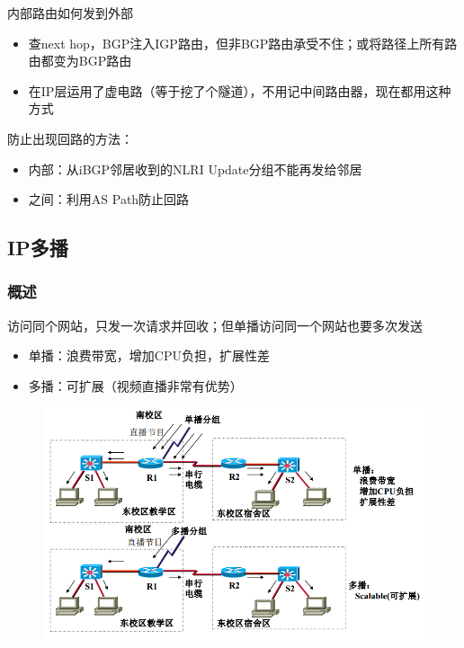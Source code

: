 内部路由如何发到外部
\begin{itemize}
\item 查next hop，BGP注入IGP路由，但非BGP路由承受不住；或将路径上所有路由都变为BGP路由
\item 在IP层运用了虚电路（等于挖了个隧道），不用记中间路由器，现在都用这种方式
\end{itemize}

\myhline
防止出现回路的方法：
\begin{itemize}
\item 内部：从iBGP邻居收到的NLRI Update分组不能再发给邻居
\item 之间：利用AS Path防止回路
\end{itemize}

\subsection{IP多播}
\subsubsection{概述}
访问同个网站，只发一次请求并回收；但单播访问同一个网站也要多次发送
\begin{itemize}
\item 单播：浪费带宽，增加CPU负担，扩展性差
\item 多播：可扩展（视频直播非常有优势）
\end{itemize}
\begin{figure}[H]
	\centering
	\includegraphics[width=0.8\linewidth]{fig/multicast.png}
\end{figure}

